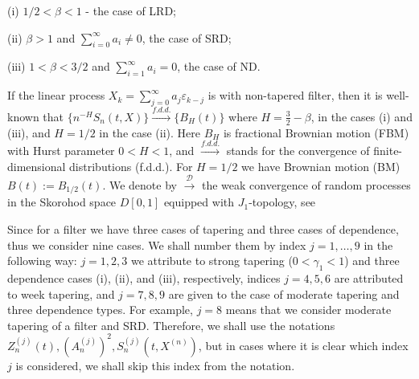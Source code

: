 \documentclass[12pt]{article}
\def\b{\beta}
\def\e{\varepsilon}
\def\g{\gamma}
\def\cd{{\mathscr D}}
\def\wc{\stackrel{\cd}{\longrightarrow}}
\def\fdd{\stackrel{f.d.d.}{\longrightarrow}}
\theoremstyle{plain}
\theoremstyle{definition}
\begin{document}
(i) $1/2<\b<1$ - the case of LRD;

(ii) $\b>1$ and $\sum_{i=0}^\infty a_i\ne 0$, the case of SRD;

(iii) $1<\b<3/2$ and $\sum_{i=1}^\infty a_i=0$, the case of ND.

If the linear process $X_k=\sum_{j=0}^\infty  a_j\e_{k-j}$ is with non-tapered filter, then it is well-known that
$\{n^{-H}S_n(t, X)\}\fdd \{B_H (t)\}$
where
$H=\frac{3}{2}-\b $, in  the  cases  (i)  and (iii), and $H=1/2$ in the case (ii).
Here $B_H$  is fractional Brownian motion (FBM) with Hurst parameter $0<H<1$, and $\fdd $ stands for the  convergence of finite-dimensional distributions (f.d.d.). For $H=1/2$ we  have Brownian motion (BM) $B(t):=B_{1/2}(t)$. We denote by $\wc$ the weak convergence of random processes in the Skorohod space $D[0,1]$ equipped with $J_1$-topology, see \cite{Billingsley}

Since for a filter we have three cases of tapering and three cases of dependence, thus we  consider nine cases. We shall number them by index $j=1,\dots , 9$ in the following way: $j=1, 2, 3$ we attribute to strong tapering ($0<\g_1<1$) and three dependence cases (i), (ii), and (iii), respectively, indices $j=4, 5, 6$ are attributed to week tapering, and $j=7, 8, 9$ are given to the case of moderate tapering and three dependence types. For example, $j=8$ means that we consider moderate tapering of  a filter and SRD. Therefore, we shall use the notations $Z_n^{(j)}(t), (A_n^{(j)})^2, S_n^{(j)}(t, X^{(n)})$, but in cases where it is clear which index $j$ is considered, we shall skip this index from the notation.
\end{document}
